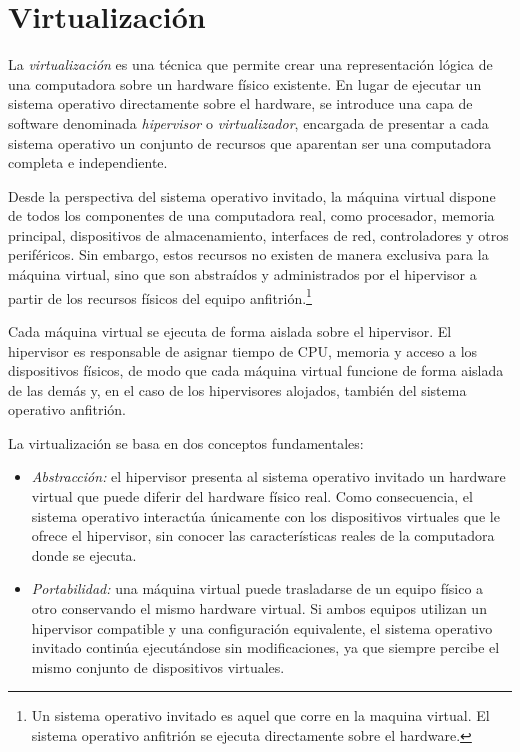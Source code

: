 \chapter{Virtualización}

La \textit{virtualización} es una técnica que permite crear una representación lógica de una computadora sobre un hardware físico existente. En lugar de ejecutar un sistema operativo directamente sobre el hardware, se introduce una capa de software denominada \textit{hipervisor} o \textit{virtualizador}, encargada de presentar a cada sistema operativo un conjunto de recursos que aparentan ser una computadora completa e independiente.

Desde la perspectiva del sistema operativo invitado, la máquina virtual dispone de todos los componentes de una computadora real, como procesador, memoria principal, dispositivos de almacenamiento, interfaces de red, controladores y otros periféricos. Sin embargo, estos recursos no existen de manera exclusiva para la máquina virtual, sino que son abstraídos y administrados por el hipervisor a partir de los recursos físicos del equipo anfitrión.\footnote{Un sistema operativo invitado es aquel que corre en la maquina virtual. El sistema operativo anfitrión se ejecuta directamente sobre el hardware.}

Cada máquina virtual se ejecuta de forma aislada sobre el hipervisor. El hipervisor es responsable de asignar tiempo de CPU, memoria y acceso a los dispositivos físicos, de modo que cada máquina virtual funcione de forma aislada de las demás y, en el caso de los hipervisores alojados, también del sistema operativo anfitrión.

La virtualización se basa en dos conceptos fundamentales:
\begin{itemize}
  \item \textit{Abstracción:} el hipervisor presenta al sistema operativo invitado un hardware virtual que puede diferir del hardware físico real. Como consecuencia, el sistema operativo interactúa únicamente con los dispositivos virtuales que le ofrece el hipervisor, sin conocer las características reales de la computadora donde se ejecuta.
  \item \textit{Portabilidad:} una máquina virtual puede trasladarse de un equipo físico a otro conservando el mismo hardware virtual. Si ambos equipos utilizan un hipervisor compatible y una configuración equivalente, el sistema operativo invitado continúa ejecutándose sin modificaciones, ya que siempre percibe el mismo conjunto de dispositivos virtuales.
\end{itemize}

